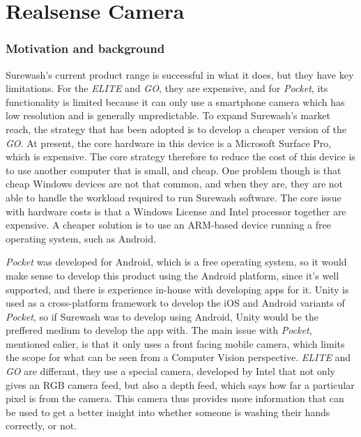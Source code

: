\part{Realsense Camera}
\section{Motivation and background}
Surewash's current product range is successful in what it does, but they have key limitations. For the {\slshape ELITE} and {\slshape GO}, they are expensive, and for {\slshape Pocket}, its functionality is limited because it can only use a smartphone camera which has low resolution and is generally unpredictable. To expand Surewash's market reach, the strategy that has been adopted is to develop a cheaper version of the {\slshape GO}. At present, the core hardware in this device is a Microsoft Surface Pro, which is expensive. The core strategy therefore to reduce the cost of this device is to use another computer that is small, and cheap. One problem though is that cheap Windows devices are not that common, and when they are, they are not able to handle the workload required to run Surewash software. The core issue with hardware costs is that a Windows License and Intel processor together are expensive. A cheaper solution is to use an ARM-based device running a free operating system, such as Android.

{\slshape Pocket} was developed for Android, which is a free operating system, so it would make sense to develop this product using the Android platform, since it's well supported, and there is experience in-house with developing apps for it. Unity is used as a cross-platform framework to develop the iOS and Android variants of {\slshape Pocket}, so if Surewash was to develop using Android, Unity would be the preffered medium to develop the app with. The main issue with {\slshape Pocket}, mentioned ealier, is that it only uses a front facing mobile camera, which limits the scope for what can be seen from a Computer Vision perspective. {\slshape ELITE} and {\slshape GO} are differant, they use a special camera, developed by Intel that not only gives an RGB camera feed, but also a depth feed, which says how far a particular pixel is from the camera. This camera thus provides more information that can be used to get a better insight into whether someone is washing their hands correctly, or not.

